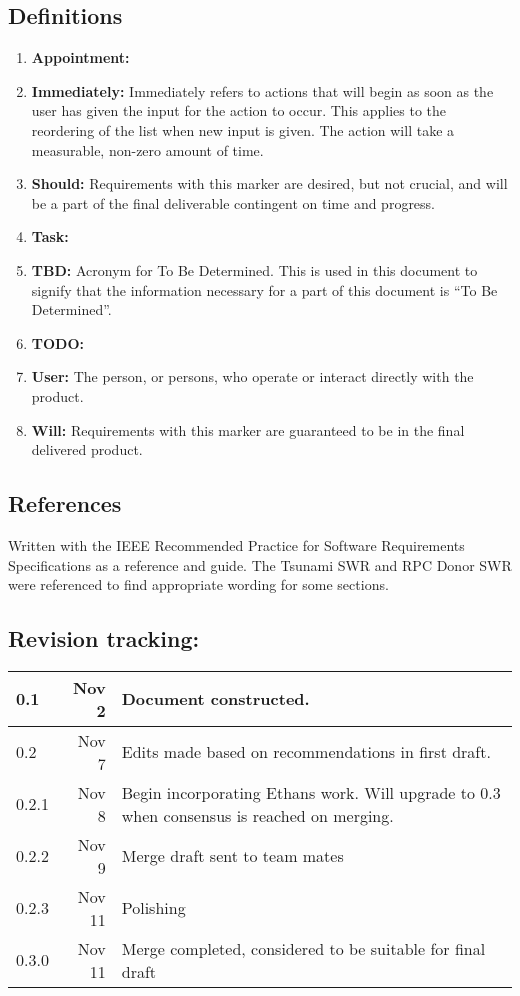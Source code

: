 \documentclass[12pt,a4paper]{article}
\begin{document}
\subsection{Definitions}
\begin{enumerate}
\item \textbf{Appointment:}
\item \textbf{Immediately:} Immediately refers to actions that will begin as soon as the user has given the input for the action to occur.  This applies to the reordering of the list when new input is given.  The action will take a measurable, non-zero amount of time.
\item \textbf{Should:} Requirements with this marker are desired, but not crucial, and will be a part of the final deliverable contingent on time and progress.
\item \textbf{Task:}
\item \textbf{TBD:} Acronym for To Be Determined. This is used in this document to signify that the information necessary for a part of this document is ``To Be Determined''.
\item \textbf{TODO:}
\item \textbf{User:} The person, or persons, who operate or interact directly with the product.
\item \textbf{Will:} Requirements with this marker are guaranteed to be in the final delivered product.
\end{enumerate}

\subsection{References}
Written with the IEEE Recommended Practice for Software Requirements Specifications as a reference and guide. The Tsunami SWR and RPC Donor SWR were referenced to find appropriate wording for some sections.

\subsection{Revision tracking:}
\begin{tabular}{|l|r|p{5.5in}|}
\hline
0.1 & Nov 2 & Document constructed.\\
\hline
0.2 & Nov 7 & Edits made based on recommendations in first draft.\\
\hline
0.2.1 & Nov 8 & Begin incorporating Ethans work. Will upgrade to 0.3 when consensus is reached on merging. \\
\hline
0.2.2 & Nov 9 & Merge draft sent to team mates\\
\hline
0.2.3 & Nov 11 & Polishing \\
\hline
0.3.0 & Nov 11 & Merge completed, considered to be suitable for final draft\\
\hline
\end{tabular}
\end{document}
